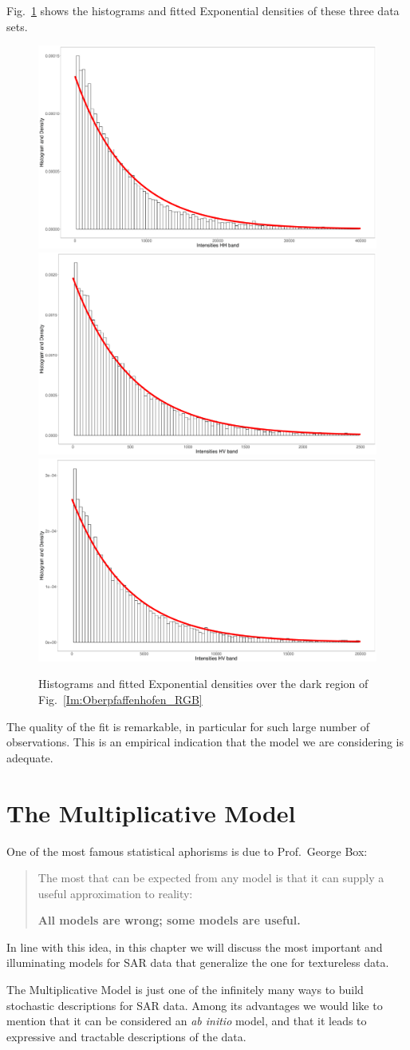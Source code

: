 \documentclass{beamer}
\begin{document}
\begin{frame} 
Fig.~\ref{Fig:FittedDarkRegion} shows the histograms and fitted Exponential densities of these three data sets.

\begin{figure}
\centering
\includegraphics[width=.32\linewidth]{darkHHfit}
\includegraphics[width=.32\linewidth]{darkHVfit}
\includegraphics[width=.32\linewidth]{darkVVfit}
\caption{Histograms and fitted Exponential densities over the dark region of Fig.~\ref{Im:Oberpfaffenhofen_RGB}}\label{Fig:FittedDarkRegion}
\end{figure}

The quality of the fit is remarkable, in particular for such large number of observations.
This is an empirical indication that the model we are considering is adequate.
\end{frame}


\section{The Multiplicative Model}

\begin{frame}[allowframebreaks]
One of the most famous statistical aphorisms is due to Prof.~George Box:
\begin{quotation}
The most that can be expected from any model is that it can supply a useful approximation to reality:

\textbf{All models are wrong; some models are useful.}
\end{quotation}
In line with this idea, in this chapter we will discuss the most important and illuminating models for SAR data that generalize the one for textureless data.

The Multiplicative Model is just one of the infinitely many ways to build stochastic descriptions for SAR data.
Among its advantages we would like to mention that it can be considered an \textit{ab initio} model, and that it leads to expressive and tractable descriptions of the data.
\end{frame}
\end{document}
